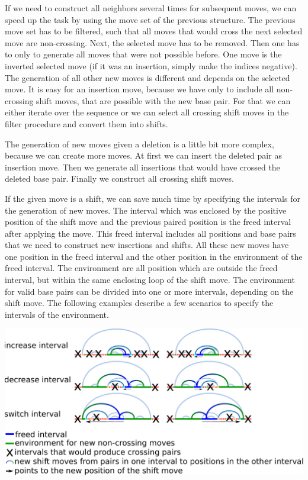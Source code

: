 If we need to construct all neighbors several times for subsequent moves, we can speed up the task by using the move set of the previous structure. The previous move set has to be filtered, such that all moves that would cross the next selected move are non-\/crossing. Next, the selected move has to be removed. Then one has to only to generate all moves that were not possible before. One move is the inverted selected move (if it was an insertion, simply make the indices negative). The generation of all other new moves is different and depends on the selected move. It is easy for an insertion move, because we have only to include all non-\/crossing shift moves, that are possible with the new base pair. For that we can either iterate over the sequence or we can select all crossing shift moves in the filter procedure and convert them into shifts.

The generation of new moves given a deletion is a little bit more complex, because we can create more moves. At first we can insert the deleted pair as insertion move. Then we generate all insertions that would have crossed the deleted base pair. Finally we construct all crossing shift moves.

If the given move is a shift, we can save much time by specifying the intervals for the generation of new moves. The interval which was enclosed by the positive position of the shift move and the previous paired position is the freed interval after applying the move. This freed interval includes all positions and base pairs that we need to construct new insertions and shifts. All these new moves have one position in the freed interval and the other position in the environment of the freed interval. The environment are all position which are outside the freed interval, but within the same enclosing loop of the shift move. The environment for valid base pairs can be divided into one or more intervals, depending on the shift move. The following examples describe a few scenarios to specify the intervals of the environment.

 
\begin{DoxyImageNoCaption}
  \mbox{\includegraphics[width=\textwidth,height=\textheight/2,keepaspectratio=true]{shift_move_intervals}}
\end{DoxyImageNoCaption}


